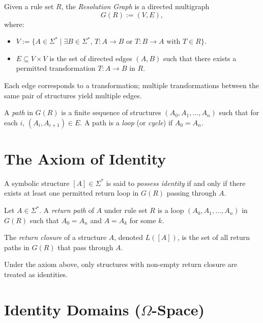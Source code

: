 \begin{definition}
Given a rule set $R$, the \emph{Resolution Graph} is a directed multigraph
\[
G(R) := (V, E),
\]
where:
\begin{itemize}
    \item $V := \{ A \in \Sigma^* \mid \exists B \in \Sigma^*, \, T: A \to B \text{ or } T: B \to A \text{ with } T \in R \}$.
    \item $E \subseteq V \times V$ is the set of directed edges $(A, B)$ such that there exists a permitted transformation $T: A \to B$ in $R$.
\end{itemize}
Each edge corresponds to a transformation; multiple transformations between the same pair of structures yield multiple edges.
\end{definition}

\begin{definition}
A \emph{path} in $G(R)$ is a finite sequence of structures $(A_0, A_1, \dots, A_n)$ such that for each $i$, $(A_i, A_{i+1}) \in E$. A path is a \emph{loop} (or \emph{cycle}) if $A_0 = A_n$.
\end{definition}

\section{The Axiom of Identity}

\begin{axiom}
A symbolic structure $[A] \in \Sigma^*$ is said to \emph{possess identity} if and only if there exists at least one permitted return loop in $G(R)$ passing through $A$.
\end{axiom}

\begin{definition}
Let $A \in \Sigma^*$. A \emph{return path} of $A$ under rule set $R$ is a loop $(A_0, A_1, \dots, A_n)$ in $G(R)$ such that $A_0 = A_n$ and $A = A_k$ for some $k$.
\end{definition}

\begin{definition}
The \emph{return closure} of a structure $A$, denoted $L([A])$, is the set of all return paths in $G(R)$ that pass through $A$.
\end{definition}

\noindent
Under the axiom above, only structures with non-empty return closure are treated as identities.

\section{Identity Domains ($\Omega$-Space)}

